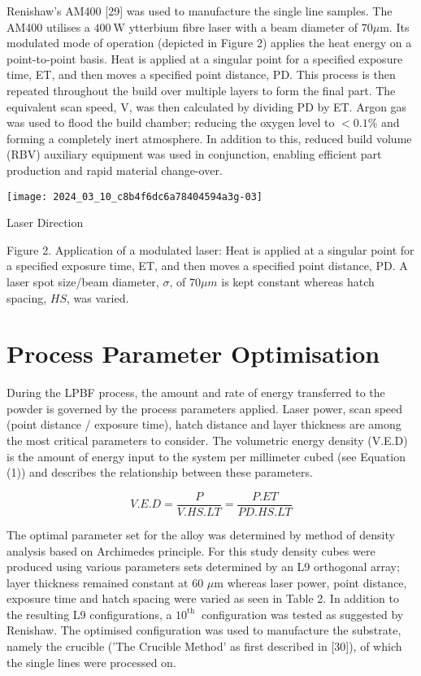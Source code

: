 \documentclass[10pt]{article}
\begin{document}
Renishaw's AM400 [29] was used to manufacture the single line samples. The AM400 utilises a $400 \mathrm{~W}$ ytterbium fibre laser with a beam diameter of $70 \mu \mathrm{m}$. Its modulated mode of operation (depicted in Figure 2) applies the heat energy on a point-to-point basis. Heat is applied at a singular point for a specified exposure time, ET, and then moves a specified point distance, PD. This process is then repeated throughout the build over multiple layers to form the final part. The equivalent scan speed, V, was then calculated by dividing PD by ET. Argon gas was used to flood the build chamber; reducing the oxygen level to $<0.1 \%$ and forming a completely inert atmosphere. In addition to this, reduced build volume (RBV) auxiliary equipment was used in conjunction, enabling efficient part production and rapid material change-over.

\begin{center}
\texttt{[image: 2024\_03\_10\_c8b4f6dc6a78404594a3g-03]}
\end{center}

Laser Direction

Figure 2. Application of a modulated laser: Heat is applied at a singular point for a specified exposure time, ET, and then moves a specified point distance, PD. A laser spot size/beam diameter, $\sigma$, of $70 \mu m$ is kept constant whereas hatch spacing, $H S$, was varied.

\section*{Process Parameter Optimisation}
During the LPBF process, the amount and rate of energy transferred to the powder is governed by the process parameters applied. Laser power, scan speed (point distance / exposure time), hatch distance and layer thickness are among the most critical parameters to consider. The volumetric energy density (V.E.D) is the amount of energy input to the system per millimeter cubed (see Equation (1)) and describes the relationship between these parameters.


\begin{equation*}
V . E . D=\frac{P}{V . H S . L T}=\frac{P . E T}{P D . H S . L T} \tag{1}
\end{equation*}


The optimal parameter set for the alloy was determined by method of density analysis based on Archimedes principle. For this study density cubes were produced using various parameters sets determined by an L9 orthogonal array; layer thickness remained constant at 60 $\mu \mathrm{m}$ whereas laser power, point distance, exposure time and hatch spacing were varied as seen in Table 2. In addition to the resulting L9 configurations, a $10^{\text {th }}$ configuration was tested as suggested by Renishaw. The optimised configuration was used to manufacture the substrate, namely the crucible ('The Crucible Method' as first described in [30]), of which the single lines were processed on.
\end{document}
